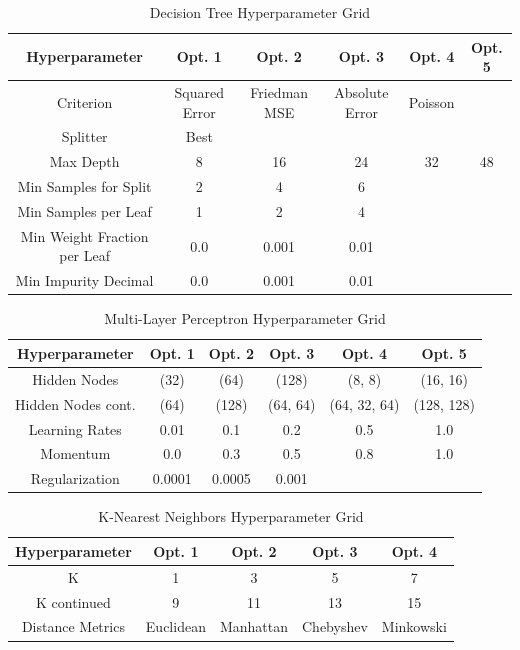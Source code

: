 \documentclass{article}
\begin{document}
\begin{table}
	\begin{center}
		\begin{tabular}{||c c c c c c||} 
		\hline\hline
		Hyperparameter & Opt. 1 & Opt. 2 & Opt. 3 & Opt. 4 & Opt. 5 \\ 
		\hline\hline
		Criterion & Squared Error & Friedman MSE & Absolute Error & Poisson & \\ \hline 
		Splitter & Best & & & &  \\ \hline
		Max Depth & 8 & 16 & 24 & 32 & 48 \\ \hline
		Min Samples for Split & 2 & 4 & 6 & &  \\ \hline
		Min Samples per Leaf & 1 & 2 & 4 & &  \\ \hline
		Min Weight Fraction per Leaf & 0.0 & 0.001 & 0.01 & &  \\ \hline
		Min Impurity Decimal & 0.0 & 0.001 & 0.01 & &  \\
		\hline\hline
		\end{tabular}
	\end{center}
	\caption{Decision Tree Hyperparameter Grid}
	\label{tab:dt_grid}
\end{table}

\begin{table}
	\begin{center}
		\begin{tabular}{||c c c c c c||} 
		\hline\hline
		Hyperparameter & Opt. 1 & Opt. 2 & Opt. 3 & Opt. 4 & Opt. 5 \\ 
		\hline\hline
		Hidden Nodes & (32) & (64) & (128) & (8, 8) & (16, 16) \\ \hline
		Hidden Nodes cont. & (64) & (128) & (64, 64) & (64, 32, 64) & (128, 128) \\ \hline
		Learning Rates & 0.01 & 0.1 & 0.2 & 0.5 & 1.0 \\ \hline
		Momentum & 0.0 & 0.3 & 0.5 & 0.8 & 1.0 \\ \hline
		Regularization & 0.0001 & 0.0005 & 0.001 & & \\ 
		\hline\hline
		\end{tabular}
	\end{center}
	\caption{Multi-Layer Perceptron Hyperparameter Grid}
	\label{tab:mlp_grid}
\end{table}

\begin{table}
	\begin{center}
		\begin{tabular}{||c c c c c||} 
		\hline\hline
		Hyperparameter & Opt. 1 & Opt. 2 & Opt. 3 & Opt. 4 \\ 
		\hline\hline
		K & 1 & 3 & 5 & 7 \\ \hline
		K continued & 9 & 11 & 13 & 15 \\ \hline
		Distance Metrics & Euclidean & Manhattan & Chebyshev & Minkowski \\ \hline
		\hline\hline
		\end{tabular}
	\end{center}
	\caption{K-Nearest Neighbors Hyperparameter Grid}
	\label{tab:knn_grid}
\end{table}
\end{document}
